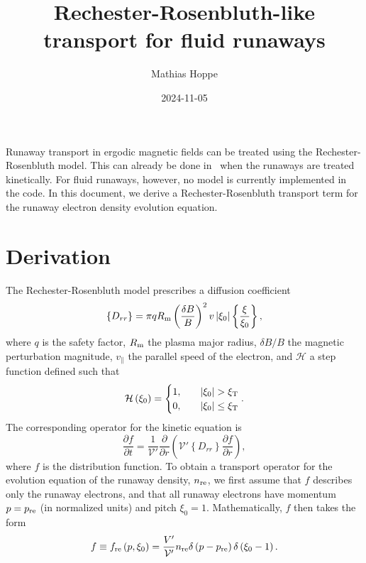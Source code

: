 \documentclass{notes}
\title{Rechester-Rosenbluth-like transport for fluid runaways}
\author{Mathias Hoppe}
\date{2024-11-05}
\newcommand{\Vp}{\mathcal{V}'}
\begin{document}
	\maketitle

	Runaway transport in ergodic magnetic fields can be treated using the
	Rechester-Rosenbluth model. This can already be done in \DREAM\ when the
	runaways are treated kinetically. For fluid runaways, however, no model
	is currently implemented in the code. In this document, we derive a
	Rechester-Rosenbluth transport term for the runaway electron density
	evolution equation.

	\section*{Derivation}
	The Rechester-Rosenbluth model prescribes a diffusion coefficient
	\begin{equation}
		\left\{D_{rr}\right\} = \pi q R_{\rm m}\left(
			\frac{\delta B}{B}
		\right)^2
		v\left|\xi_0\right|
		\left\{\frac{\xi}{\xi_0}\right\},
	\end{equation}
	where $q$ is the safety factor, $R_{\rm m}$ the plasma major radius,
	$\delta B/B$ the magnetic perturbation magnitude, $v_\parallel$ the parallel
	speed of the electron, and $\mathcal{H}$ a step function defined such that
	\begin{equation}
		\mathcal{H}\left(\xi_0\right) =
		\begin{cases}
			1, \quad &\left|\xi_0\right| > \xi_{\rm T}\\
			0, \quad &\left|\xi_0\right|\leq \xi_{\rm T}
		\end{cases}.
	\end{equation}
	The corresponding operator for the kinetic equation is
	\begin{equation}\label{eq:dfre}
		\frac{\partial f}{\partial t} =
			\frac{1}{\Vp}\frac{\partial}{\partial r}\left(
				\Vp \left\{D_{rr}\right\}\frac{\partial f}{\partial r}
			\right),
	\end{equation}
	where $f$ is the distribution function. To obtain a transport operator for
	the evolution equation of the runaway density, $n_{\rm re}$, we first assume
	that $f$ describes only the runaway electrons, and that all runaway
	electrons have momentum $p=p_{\rm re}$ (in normalized units) and pitch
	$\xi_0=1$. Mathematically, $f$ then takes the form
	\begin{equation}
		f\equiv f_{\rm re}\left(p,\xi_0\right) =
			\frac{V'}{\Vp}n_{\rm re}\delta\left(p-p_{\rm re}\right)
				\delta\left(\xi_0-1\right).
	\end{equation}
\end{document}
